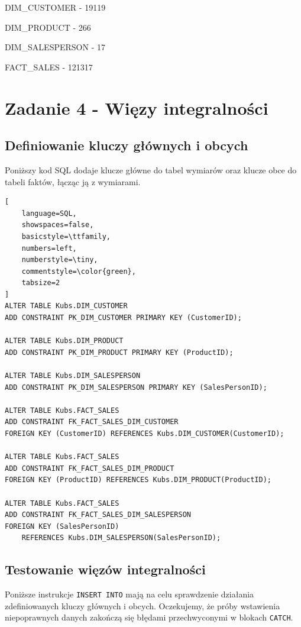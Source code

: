 \documentclass[a4paper,12pt]{article}
\begin{document}
DIM\_CUSTOMER - 19119

DIM\_PRODUCT - 266

DIM\_SALESPERSON - 17

FACT\_SALES - 121317

\section{Zadanie 4 - Więzy integralności}

\subsection{Definiowanie kluczy głównych i obcych}

Poniższy kod SQL dodaje klucze główne do tabel wymiarów oraz klucze obce do tabeli faktów, łącząc ją z wymiarami.

    {\small
        \begin{lstlisting}[
    language=SQL,
    showspaces=false,
    basicstyle=\ttfamily,
    numbers=left,
    numberstyle=\tiny,
    commentstyle=\color{green},
    tabsize=2
]
ALTER TABLE Kubs.DIM_CUSTOMER
ADD CONSTRAINT PK_DIM_CUSTOMER PRIMARY KEY (CustomerID);

ALTER TABLE Kubs.DIM_PRODUCT
ADD CONSTRAINT PK_DIM_PRODUCT PRIMARY KEY (ProductID);

ALTER TABLE Kubs.DIM_SALESPERSON
ADD CONSTRAINT PK_DIM_SALESPERSON PRIMARY KEY (SalesPersonID);

ALTER TABLE Kubs.FACT_SALES
ADD CONSTRAINT FK_FACT_SALES_DIM_CUSTOMER
FOREIGN KEY (CustomerID) REFERENCES Kubs.DIM_CUSTOMER(CustomerID);

ALTER TABLE Kubs.FACT_SALES
ADD CONSTRAINT FK_FACT_SALES_DIM_PRODUCT
FOREIGN KEY (ProductID) REFERENCES Kubs.DIM_PRODUCT(ProductID);

ALTER TABLE Kubs.FACT_SALES
ADD CONSTRAINT FK_FACT_SALES_DIM_SALESPERSON
FOREIGN KEY (SalesPersonID) 
    REFERENCES Kubs.DIM_SALESPERSON(SalesPersonID);
\end{lstlisting}
    }

\subsection{Testowanie więzów integralności}

Poniższe instrukcje \texttt{INSERT INTO} mają na celu sprawdzenie działania zdefiniowanych kluczy głównych i obcych. Oczekujemy, że próby wstawienia niepoprawnych danych zakończą się błędami przechwyconymi w blokach \texttt{CATCH}.
\end{document}
